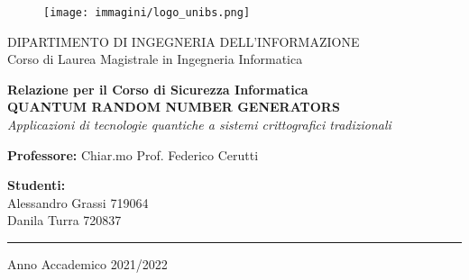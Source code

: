 \begin{titlepage}
    \begin{center}
        
        \begin{figure}[t]
            \centering
            \texttt{[image: immagini/logo\_unibs.png]}    
        \end{figure}

        \vspace*{10mm}
        
        {\Large
            DIPARTIMENTO DI INGEGNERIA DELL'INFORMAZIONE\\
        }
    \vspace*{1mm}
        {\Large
            Corso di Laurea Magistrale in Ingegneria Informatica\\

        }    
        
        \vspace*{20mm}

        {\LARGE
            \textbf{
                Relazione per il Corso di Sicurezza Informatica\\
                \vspace*{5mm}
                QUANTUM RANDOM NUMBER GENERATORS\\
            }
            \textit{Applicazioni di tecnologie quantiche a sistemi crittografici tradizionali}\\
        }

    \end{center}

    \vspace*{20mm}

    \begin{flushleft}
        {\Large
            \textbf{Professore:} Chiar.mo Prof. Federico Cerutti
        }
        
    \end{flushleft}

    \vspace*{5mm}

    \begin{flushright}
        {\Large
            \textbf{Studenti:\\}
            Alessandro Grassi 719064\\
            Danila Turra 720837\\
        }

    \end{flushright}

 
    \vspace*{30mm}

    \begin{center}
         \rule{400pt}{0.5pt}
    \end{center}
    
    \begin{center}
    {\Large
        Anno Accademico 2021/2022
    }
    \end{center}
    
    
\end{titlepage}
\restoregeometry